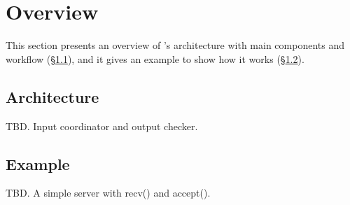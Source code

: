 
\section{\xxx Overview}\label{sec:overview}

This section presents an overview of \xxx's architecture with main 
components and workflow (\S\ref{sec:arch}), and it gives an example to show how 
it works (\S\ref{sec:example}).



\subsection{Architecture}\label{sec:arch}

TBD. Input coordinator and output checker.

\subsection{Example}\label{sec:example}

TBD. A simple server with recv() and accept().